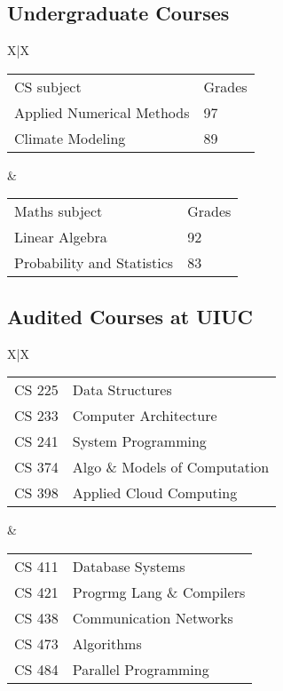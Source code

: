 \documentclass{res}
\let\oldsubsection\subsection
\renewcommand{\subsection}[1]{\vspace{-0.2in}\oldsubsection{#1}\vspace{-0.25in}}
\begin{document}
\begin{resume}
	\subsection{Undergraduate Courses}
	\begin{tabularx}{\textwidth}{X|X}
		\begin{tabular}{ll}
			CS subject                & Grades  \\
			Applied Numerical Methods & 97      \\
			Climate Modeling          & 89     
		\end{tabular}
		 & 
		\begin{tabular}{ll}
			Maths subject              & Grades \\
			Linear Algebra             & 92     \\
			Probability and Statistics & 83     \\
		\end{tabular}
	\end{tabularx}%
	\vspace{-0.15in}
	
	\subsection{Audited Courses at UIUC}
	\begin{tabularx}{\textwidth}{X|X}
		\begin{tabular}{rl}
			CS 225 & Data Structures               \\
			CS 233 & Computer Architecture         \\
			CS 241 & System Programming            \\
			CS 374 & Algo \& Models of Computation \\
			CS 398 & Applied Cloud Computing       \\
		\end{tabular}
		 & 
		\begin{tabular}{rl}
			CS 411 & Database Systems          \\
			CS 421 & Progrmg Lang \& Compilers \\
			CS 438 & Communication Networks    \\
			CS 473 & Algorithms                \\
			CS 484 & Parallel Programming      \\
		\end{tabular}
	\end{tabularx}%
	\vspace{-0.15in}
	

\end{resume}
\end{document}
